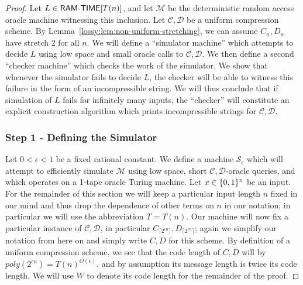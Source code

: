 \begin{proof}
Let $L \in \cl{RAM\dash TIME}[T(n)]$, and let $\mathcal{M}$ be the deterministic random access oracle machine witnessing this inclusion. Let $\mathcal{C},\mathcal{D}$ be a uniform compression scheme. By Lemma~\ref{lossy:lem:non-uniform-stretching}, we can assume $C_n,D_n$ have stretch 2 for all $n$. We will define a ``simulator machine'' which attempts to decide $L$ using low space and small oracle calls to $\mathcal{C},\mathcal{D}$. We then define a second ``checker machine'' which checks the work of the simulator. We show that whenever the simulator fails to decide $L$, the checker will be able to witness this failure in the form of an incompressible string. We will thus conclude that if simulation of $L$ fails for infinitely many inputs, the ``checker'' will constitute an explicit construction algorithm which prints incompressible strings for $\mathcal{C},\mathcal{D}$.

\subsubsection*{Step 1 - Defining the Simulator}
Let $0 < \epsilon < 1$ be a fixed rational constant. We define a machine $\mathcal{S}_{\epsilon}$ which will attempt to efficiently simulate $\mathcal{M}$ using low space, short $\mathcal{C},\mathcal{D}$-oracle queries, and which operates on a 1-tape oracle Turing machine. Let $x \in \{0,1\}^n$ be an input. For the remainder of this section we will keep a particular input length $n$ fixed in our mind and thus drop the dependence of other terms on $n$ in our notation; in particular we will use the abbreviation $T = T(n)$. Our machine will now fix a particular instance of $\mathcal{C},\mathcal{D}$, in particular $C_{\lceil 2^{\epsilon n}\rceil }, D_{\lceil 2^{\epsilon n} \rceil}$; again we simplify our notation from here on and simply write $C,D$ for this scheme. By definition of a uniform compression scheme, we see that the code length of $C,D$ will by $poly(2^{\epsilon n}) = T(n)^{O(\epsilon)}$, and by assumption its message length is twice its code length. We will use $W$ to denote its code length for the remainder of the proof. 


\end{proof}
